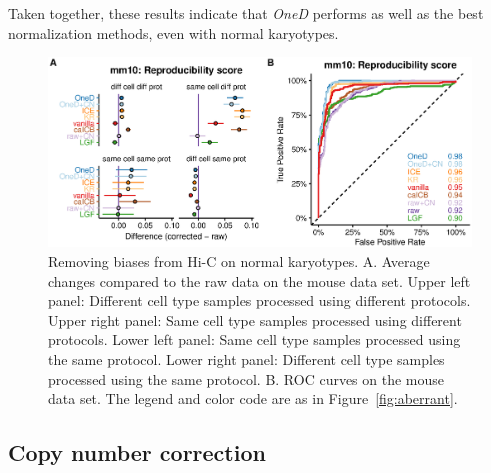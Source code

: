 \documentclass[a4,center,fleqn]{NAR}
\providecommand{\DIFadd}[1]{{\protect\color{red}#1}} %
\providecommand{\DIFdel}[1]{{\protect}}                      %
\providecommand{\DIFaddFL}[1]{\DIFadd{#1}} %
\providecommand{\DIFdelFL}[1]{\DIFdel{#1}} %
\providecommand{\DIFaddbeginFL}{} %
\providecommand{\DIFaddendFL}{} %
\providecommand{\DIFdelbeginFL}{} %
\providecommand{\DIFdelendFL}{} %
\begin{document}
Taken together, these results indicate that \textit{OneD} performs as well
as the best normalization methods, even with normal karyotypes.

\begin{figure}
\DIFdelbeginFL %
\DIFdelendFL \DIFaddbeginFL \centerline{\includegraphics[width=.49\textwidth]
  {nar_figures/figure_3.eps}}
\DIFaddendFL \caption{\DIFdelbeginFL \DIFdelFL{Results of the comparison between samples with }\DIFdelendFL \DIFaddbeginFL \DIFaddFL{Removing biases from Hi-C on }\DIFaddendFL normal karyotypes. A. Average
  changes compared to the raw data on the mouse data set.
  \DIFaddbeginFL \DIFaddFL{Upper left panel: Different cell type samples
processed using different protocols. Upper right panel: Same cell
type samples processed using different protocols. Lower left panel:
Same cell type samples processed using the same protocol. Lower right panel:
Different cell type samples processed using the same protocol. }\DIFaddendFL B. ROC curves on
the mouse data set. The legend \DIFdelbeginFL \DIFdelFL{is }\DIFdelendFL \DIFaddbeginFL \DIFaddFL{and color code are }\DIFaddendFL as in Figure~\ref{fig:aberrant}.}
\label{fig:normal}
\end{figure}


\subsection{Copy number correction}
\end{document}
